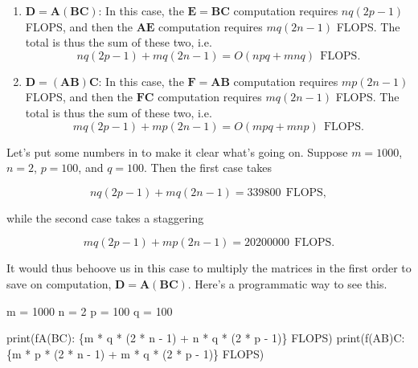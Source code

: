 \documentclass[
  letterpaper,
  DIV=11,
  numbers=noendperiod]{scrreprt}
\newenvironment{Shaded}{\begin{snugshade}}{\end{snugshade}}
\newcommand{\BuiltInTok}[1]{\textcolor[rgb]{0.00,0.23,0.31}{#1}}
\newcommand{\DecValTok}[1]{\textcolor[rgb]{0.68,0.00,0.00}{#1}}
\newcommand{\NormalTok}[1]{\textcolor[rgb]{0.00,0.23,0.31}{#1}}
\newcommand{\OperatorTok}[1]{\textcolor[rgb]{0.37,0.37,0.37}{#1}}
\newcommand{\SpecialCharTok}[1]{\textcolor[rgb]{0.37,0.37,0.37}{#1}}
\newcommand{\SpecialStringTok}[1]{\textcolor[rgb]{0.13,0.47,0.30}{#1}}
\begin{document}
\begin{enumerate}
\def\labelenumi{\arabic{enumi}.}
\item
  \(\mathbf{D} = \mathbf{A}(\mathbf{B}\mathbf{C})\): In this case, the
  \(\mathbf{E}=\mathbf{B}\mathbf{C}\) computation requires \(nq(2p-1)\)
  FLOPS, and then the \(\mathbf{A}\mathbf{E}\) computation requires
  \(mq(2n-1)\) FLOPS. The total is thus the sum of these two, i.e.
  \[nq(2p-1) + mq(2n-1) = O(npq+mnq) \ \ \text{FLOPS}.\]
\item
  \(\mathbf{D} = (\mathbf{A}\mathbf{B})\mathbf{C}\): In this case, the
  \(\mathbf{F}=\mathbf{A}\mathbf{B}\) computation requires \(mp(2n-1)\)
  FLOPS, and then the \(\mathbf{F}\mathbf{C}\) computation requires
  \(mq(2n-1)\) FLOPS. The total is thus the sum of these two, i.e.
  \[mq(2p-1) + mp(2n-1) = O(mpq+mnp) \ \ \text{FLOPS}.\]
\end{enumerate}

Let's put some numbers in to make it clear what's going on. Suppose
\(m=1000\), \(n=2\), \(p=100\), and \(q=100\). Then the first case takes

\[nq(2p-1) + mq(2n-1) = 339800 \ \ \text{FLOPS},\]

while the second case takes a staggering

\[mq(2p-1) + mp(2n-1) = 20200000 \ \ \text{FLOPS}.\]

It would thus behoove us in this case to multiply the matrices in the
first order to save on computation,
\(\mathbf{D} = \mathbf{A}(\mathbf{B}\mathbf{C})\). Here's a programmatic
way to see this.

\begin{Shaded}
\begin{Highlighting}[]
\NormalTok{m }\OperatorTok{=} \DecValTok{1000}
\NormalTok{n }\OperatorTok{=} \DecValTok{2}
\NormalTok{p }\OperatorTok{=} \DecValTok{100}
\NormalTok{q }\OperatorTok{=} \DecValTok{100}

\BuiltInTok{print}\NormalTok{(}\SpecialStringTok{f\textquotesingle{}A(BC): }\SpecialCharTok{\{}\NormalTok{m }\OperatorTok{*}\NormalTok{ q }\OperatorTok{*}\NormalTok{ (}\DecValTok{2} \OperatorTok{*}\NormalTok{ n }\OperatorTok{{-}} \DecValTok{1}\NormalTok{) }\OperatorTok{+}\NormalTok{ n }\OperatorTok{*}\NormalTok{ q }\OperatorTok{*}\NormalTok{ (}\DecValTok{2} \OperatorTok{*}\NormalTok{ p }\OperatorTok{{-}} \DecValTok{1}\NormalTok{)}\SpecialCharTok{\}}\SpecialStringTok{ FLOPS\textquotesingle{}}\NormalTok{)}
\BuiltInTok{print}\NormalTok{(}\SpecialStringTok{f\textquotesingle{}(AB)C: }\SpecialCharTok{\{}\NormalTok{m }\OperatorTok{*}\NormalTok{ p }\OperatorTok{*}\NormalTok{ (}\DecValTok{2} \OperatorTok{*}\NormalTok{ n }\OperatorTok{{-}} \DecValTok{1}\NormalTok{) }\OperatorTok{+}\NormalTok{ m }\OperatorTok{*}\NormalTok{ q }\OperatorTok{*}\NormalTok{ (}\DecValTok{2} \OperatorTok{*}\NormalTok{ p }\OperatorTok{{-}} \DecValTok{1}\NormalTok{)}\SpecialCharTok{\}}\SpecialStringTok{ FLOPS\textquotesingle{}}\NormalTok{)}
\end{Highlighting}
\end{Shaded}
\end{document}
